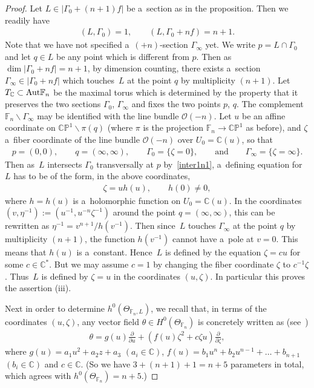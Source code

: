 \documentclass[11pt]{article}
\numberwithin{equation}{section}
\begin{document}
\begin{proof}
Let $L\in |\Gamma_0 +(n+1)f|$ be a~section as in the proposition.
Then we readily have
\begin{gather}
\label{inter1n1}
(L,\Gamma_0)=1,
\qquad
(L,\Gamma_0+nf) = n+1.
\end{gather}
Note that we have not specif\/ied a~$(+n)$-section $\Gamma_{\infty}$ yet.
We write $p=L\cap\Gamma_0$ and let $q\in L$ be any point which is dif\/ferent from $p$.
Then as $\dim |\Gamma_0+nf| = n+1$, by dimension counting, there exists a~section $\Gamma_{\infty} \in |\Gamma_0 + nf|$
which touches~$L$ at the point $q$ by multiplicity $(n+1)$.
Let $T_{\mathbb{C}}\subset{\rm{Aut}}\mathbb{F}_n$ be the maximal torus which is determined by the property that it
preserves the two sections $\Gamma_0$, $\Gamma_{\infty}$ and f\/ixes the two points $p$, $q$.
The complement $\mathbb{F}_n\backslash \Gamma_{\infty}$ may be identif\/ied with the line bundle $\mathscr O(-n)$.
Let $u$ be an af\/f\/ine coordinate on $\mathbb{CP}^1\backslash \pi(q)$ (where $\pi$ is the projection
$\mathbb{F}_n\to\mathbb{CP}^1$ as before), and $\zeta$ a~f\/iber coordinate of the line bundle $\mathscr O(-n)$ over
$U_0=\mathbb{C}(u)$, so that
\begin{gather*}
p=(0,0),
\qquad
q=(\infty,\infty),
\qquad
\Gamma_{0} = \{\zeta=0\},
\qquad
\text{and}
\qquad
\Gamma_{\infty} = \{\zeta=\infty\}.
\end{gather*}
Then as~$L$ intersects $\Gamma_0$ transversally at $p$ by~\eqref{inter1n1}, a~def\/ining equation for~$L$ has to be of
the form, in the above coordinates,
\begin{gather*}
\zeta = uh(u),
\qquad
h(0)\neq 0,
\end{gather*}
where $h=h(u)$ is a~holomorphic function on $U_0 = \mathbb{C}(u)$.
In the coordinates $(v,\eta^{-1}):= (u^{-1},u^{-n}\zeta^{-1})$ around the point $q=(\infty,\infty)$, this can be
rewritten as $ \eta^{-1} = v^{n+1}/h(v^{-1})$.
Then since~$L$ touches $\Gamma_{\infty}$ at the point $q$ by multiplicity $(n+1)$, the function $h(v^{-1})$ cannot have
a~pole at $v=0$.
This means that $h(u)$ is a~constant.
Hence~$L$ is def\/ined by the equation $\zeta = cu$ for some $c\in \mathbb{C}^*$.
But we may assume $c=1$ by changing the f\/iber coordinate $\zeta$ to $c^{-1}\zeta$.
Thus~$L$ is def\/ined by $\zeta=u$ in the coordinates $(u,\zeta)$.
In particular this proves the assertion (iii).

Next in order to determine $h^0(\Theta_{\mathbb{F}_n,L})$, we recall that, in terms of the coordinates $(u,\zeta)$, any
vector f\/ield $\theta\in H^0(\Theta_{\mathbb{F}_n})$ is concretely written as (see~\cite[pp. 43--44]{MKbook})
\begin{gather}
\label{MK1}
\theta= g(u) \frac{\partial}{\partial u} + \left( f(u) \zeta^ 2 + c\zeta u \right) \frac{\partial}{\partial \zeta},
\end{gather}
where $g(u) = a_1 u^2 + a_2 z + a_3$
$(a_i\in\mathbb{C})$,
$f(u) = b_1 u^n + b_2 u^{n-1} + \dots + b_{n+1}$
$(b_i\in\mathbb{C})$ and $c\in \mathbb{C}$.
(So we have $3 + (n+1) + 1 = n + 5$ parameters in total, which agrees with $h^0(\Theta_{\mathbb{F}_n}) = n+5$.)


\end{proof}
\end{document}
